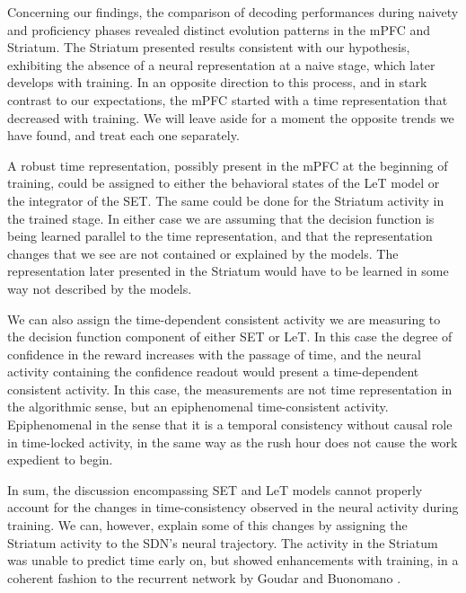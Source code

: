     
    Concerning our findings, the comparison of decoding performances during naivety and proficiency phases revealed distinct evolution patterns in the mPFC and Striatum. The Striatum presented results consistent with our hypothesis, exhibiting the absence of a neural representation at a naive stage, which later develops with training. In an opposite direction to this process, and in stark contrast to our expectations, the mPFC started with a time representation that decreased with training. We will leave aside for a moment the opposite trends we have found, and treat each one separately. 
    
    A robust time representation, possibly present in the mPFC at the beginning of training, could be assigned to either the behavioral states of the LeT model or the integrator of the SET. The same could be done for the Striatum activity in the trained stage. In either case we are assuming that the decision function is being learned parallel to the time representation, and that the representation changes that we see are not contained or explained by the models. The representation later presented in the Striatum would have to be learned in some way not described by the models. 
    
    We can also assign the time-dependent consistent activity we are measuring to the decision function component of either SET or LeT. In this case the degree of confidence in the reward increases with the passage of time, and the neural activity containing the confidence readout would present a time-dependent consistent activity. In this case, the measurements are not time representation in the algorithmic sense, but an epiphenomenal time-consistent activity. Epiphenomenal in the sense that it is a temporal consistency without causal role in time-locked activity, in the same way as the rush hour does not cause the work expedient to begin.

    In sum, the discussion encompassing SET and LeT models cannot properly account for the changes in time-consistency observed in the neural activity during training. We can, however, explain some of this changes by assigning the Striatum activity to the SDN's neural trajectory. The activity in the Striatum was unable to predict time early on, but showed enhancements with training, in a coherent fashion to the recurrent network by Goudar and Buonomano \cite{goudar2018encoding}.
    
